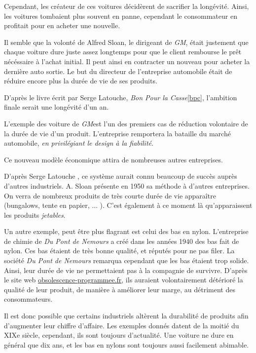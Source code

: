 Cependant, les créateur de ces voitures décidèrent de sacrifier la longévité. Ainsi, les voitures tombaient plus souvent en panne, cependant le consommateur en profitait pour en acheter une nouvelle.


Il semble que la volonté de Alfred Sloan, le dirigeant de \textit{GM}, était justement que chaque voiture dure juste assez longtemps pour que le client rembourse le prêt nécéssaire à l'achat initial.
Il peut ainsi en contracter un nouveau pour acheter la dernière auto sortie. Le but du directeur de l'entreprise automobile était de réduire encore plus la durée de vie de ses produits.

D'après le livre écrit par Serge Latouche, \textit{Bon Pour la Casse}\ref{bpc}, l'ambition finale serait une longévité d'un an.

\smallbreak

L'exemple des voiture de \textit{GM}est l'un des premiers cas de réduction volontaire de la durée de vie d'un produit. L'entreprise remportera la bataille du marché automobile, \textit{en privilégiant le design à la fiabilité}.

Ce nouveau modèle économique attira de nombreuses autres entreprises. 


D'après Serge Latouche \cite{bpc}, ce système aurait connu beaucoup de succès auprès d'autres industriels. A. Sloan présente en 1950 sa méthode à d'autres entreprises. On verra de nombreux produits de très courte durée de vie apparaître (bungalows, tente en papier, ... ). C'est également à ce moment là qu'apparaissent les produits \textit{jetables}.

Un autre exemple, peut être plus flagrant est celui des bas en nylon.
L'entreprise de chimie de \textit{Du Pont de Nemours} a créé dans les années 1940 des bas fait de nylon.
Ces bas étaient de très bonne qualité, et réputés pour ne pas filer. La société \textit{Du Pont de Nemours} remarqua cependant que les bas étaient trop solide. 
Ainsi, leur durée de vie ne permettaient pas à la compagnie de survivre.
D'après le site web \url{obsolescence-programmee.fr}, ils auraient volontairement détérioré la qualité de leur produit, de manière à améliorer leur marge, au détriment des consommateurs. 

\smallbreak

Il est donc possible que certains industriels altèrent la durabilité de produits afin d'augmenter leur chiffre d'affaire. Les exemples donnés datent de la moitié du XIXe siècle, cependant, ils sont toujours d'actualité. Une voiture ne dure en général que dix ans, et les bas en nylons sont toujours aussi facilement abimable. 

